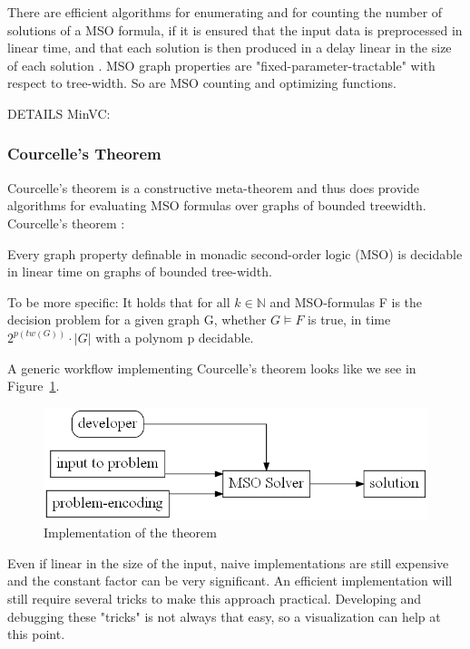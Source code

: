 \documentclass[a4paper, 12pt, bibliography=totoc]{scrartcl}
\begin{document}
There are efficient algorithms for enumerating and for counting the number of solutions of a MSO formula, if it is ensured that the input data is preprocessed in linear time, and that each solution is then produced in a delay linear in the size of each solution \cite{MSOQueriesGuillaume, ARNBORG1991308}.
MSO graph properties are "fixed-parameter-tractable" with respect to tree-width. So are MSO counting and optimizing functions. \cite{CourcelleGROW}

DETAILS MinVC: 

\subsubsection{Courcelle's Theorem}
 Courcelle's theorem is a constructive meta-theorem and thus does provide algorithms for evaluating MSO formulas over graphs of bounded treewidth.
Courcelle's theorem \cite[p. 54]{Courcelle2012}:
\begin{thm}
	Every graph property definable in monadic second-order logic (MSO) is decidable in linear time on graphs of bounded tree-width. 

\end{thm}

\noindent
To be more specific: It holds that for all $k \in \mathbb{N}$ and MSO-formulas F is the decision problem for a given graph G, whether $G \models F$ is true, in time $2^{p(tw(G))} \cdot |G|$ with a polynom p decidable.\smallskip 

\noindent
A generic workflow implementing Courcelle's theorem looks like we see in Figure~\ref{fig:UsageCourcelle}.
\begin{figure}[H]
	\includegraphics[height=0.2\textheight]{images/UsageCourcelle.gv.png}
	\caption{Implementation of the theorem}
	\label{fig:UsageCourcelle}
\end{figure}

Even if linear in the size of the input, naive implementations are still expensive and 
the constant factor can be very significant. An efficient implementation will still require several tricks to make this approach practical. Developing and debugging these "tricks" is not always that easy, so a visualization can help at this point.\smallskip 
\end{document}
